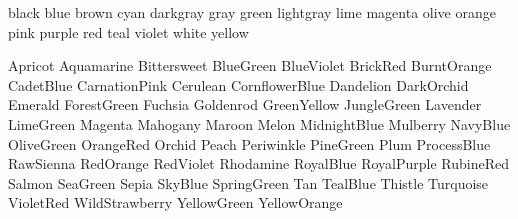 
black
blue 
brown
cyan
darkgray
gray
green
lightgray
lime
magenta
olive
orange
pink
purple
red
teal
violet
white
yellow

Apricot
Aquamarine
Bittersweet
BlueGreen
BlueViolet
BrickRed
BurntOrange
CadetBlue
CarnationPink
Cerulean
CornflowerBlue
Dandelion
DarkOrchid
Emerald
ForestGreen
Fuchsia
Goldenrod
GreenYellow
JungleGreen
Lavender
LimeGreen
Magenta
Mahogany
Maroon
Melon
MidnightBlue
Mulberry
NavyBlue
OliveGreen
OrangeRed
Orchid
Peach
Periwinkle
PineGreen
Plum
ProcessBlue
RawSienna
RedOrange
RedViolet
Rhodamine
RoyalBlue
RoyalPurple
RubineRed
Salmon
SeaGreen
Sepia
SkyBlue
SpringGreen
Tan
TealBlue	 	 	 
Thistle
Turquoise
VioletRed
WildStrawberry
YellowGreen
YellowOrange